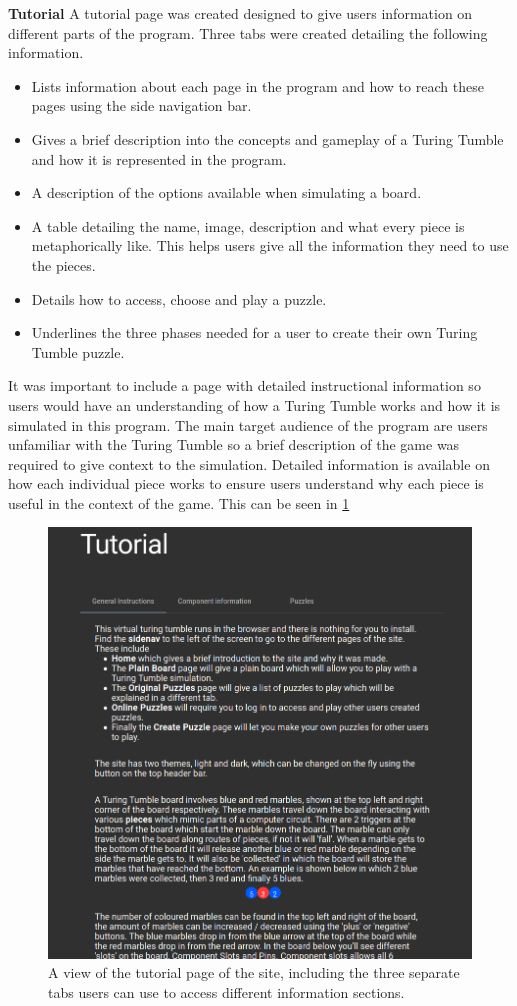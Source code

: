 \documentclass{l4proj}
\begin{document}
\textbf{Tutorial}
A tutorial page was created designed to give users information on different parts of the program. Three tabs were created detailing the following information.
\begin{itemize}
    \item Lists information about each page in the program and how to reach these pages using the side navigation bar.
    \item Gives a brief description into the concepts and gameplay of a Turing Tumble and how it is represented in the program.
    \item A description of the options available when simulating a board.
    \item A table detailing the name, image, description and what every piece is metaphorically like. This helps users give all the information they need to use the pieces.
    \item Details how to access, choose and play a puzzle.
    \item Underlines the three phases needed for a user to create their own Turing Tumble puzzle.
\end{itemize}

It was important to include a page with detailed instructional information so users would have an understanding of how a Turing Tumble works and how it is simulated in this program. The main target audience of the program are users unfamiliar with the Turing Tumble so a brief description of the game was required to give context to the simulation. Detailed information is available on how each individual piece works to ensure users understand why each piece is useful in the context of the game. This can be seen in \ref{fig:tutorial}

\begin{figure}
    \centering
    \includegraphics[width=0.7\linewidth]{images/tutorial.png}
    \caption{A view of the tutorial page of the site, including the three separate tabs users can use to access different information sections.}
    \label{fig:tutorial}
\end{figure}
\end{document}
